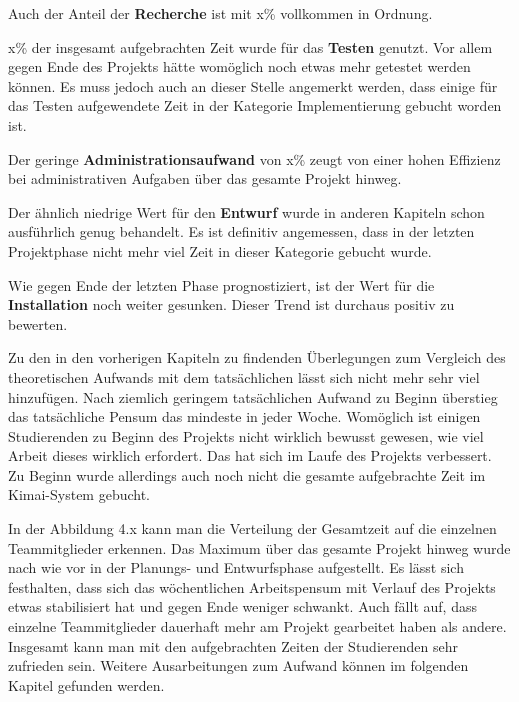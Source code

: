 \documentclass[../review_3.tex]{subfiles}
\begin{document}
Auch der Anteil der \textbf{Recherche} ist mit x\% vollkommen in Ordnung.

x\% der insgesamt aufgebrachten Zeit wurde für das \textbf{Testen} genutzt. Vor allem gegen Ende des Projekts hätte womöglich noch etwas mehr getestet werden können. Es muss jedoch auch an dieser Stelle angemerkt werden, dass einige für das Testen aufgewendete Zeit in der Kategorie Implementierung gebucht worden ist.

Der geringe \textbf{Administrationsaufwand} von x\% zeugt von einer hohen Effizienz bei administrativen Aufgaben über das gesamte Projekt hinweg.

Der ähnlich niedrige Wert für den \textbf{Entwurf} wurde in anderen Kapiteln schon ausführlich genug behandelt. Es ist definitiv angemessen, dass in der letzten Projektphase nicht mehr viel Zeit in dieser Kategorie gebucht wurde.

Wie gegen Ende der letzten Phase prognostiziert, ist der Wert für die \textbf{Installation} noch weiter gesunken. Dieser Trend ist durchaus positiv zu bewerten.


Zu den in den vorherigen Kapiteln zu findenden Überlegungen zum Vergleich des theoretischen Aufwands mit dem tatsächlichen lässt sich nicht mehr sehr viel hinzufügen. Nach ziemlich geringem tatsächlichen Aufwand zu Beginn überstieg das tatsächliche Pensum das mindeste in jeder Woche. Womöglich ist einigen Studierenden zu Beginn des Projekts nicht wirklich bewusst gewesen, wie viel Arbeit dieses wirklich erfordert. Das hat sich im Laufe des Projekts verbessert. Zu Beginn wurde allerdings auch noch nicht die gesamte aufgebrachte Zeit im Kimai-System gebucht.


In der Abbildung 4.x kann man die Verteilung der Gesamtzeit auf die einzelnen Teammitglieder erkennen. Das Maximum über das gesamte Projekt hinweg wurde nach wie vor in der Planungs- und Entwurfsphase aufgestellt. Es lässt sich festhalten, dass sich das wöchentlichen Arbeitspensum mit Verlauf des Projekts etwas stabilisiert hat und gegen Ende weniger schwankt. Auch fällt auf, dass einzelne Teammitglieder dauerhaft mehr am Projekt gearbeitet haben als andere. Insgesamt kann man mit den aufgebrachten Zeiten der Studierenden sehr zufrieden sein. Weitere Ausarbeitungen zum Aufwand können im folgenden Kapitel gefunden werden.
\end{document}
